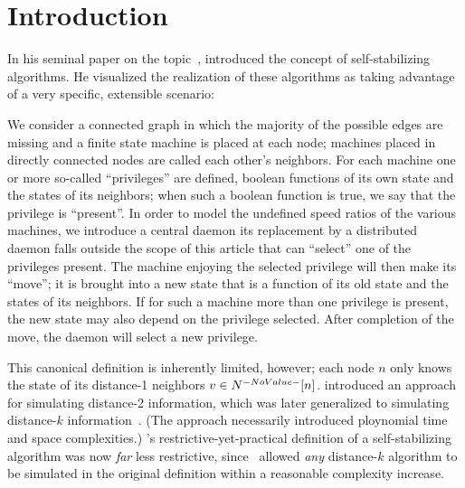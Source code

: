 \section{Introduction}
\label{sec:introduction}
\done{}
In his seminal paper on the topic~\autocite{Dijkstra:1974:SSS:361179.361202},
  \citeauthor{Dijkstra:1974:SSS:361179.361202} introduced the concept of self-stabilizing algorithms.
He visualized the realization of these algorithms as taking advantage of
  a very specific, extensible scenario:
\begin{displayquote}
  We consider a connected graph in which
    the majority of the possible edges are missing and
    a finite state machine is placed at each node;
    machines placed in directly connected nodes are called each other's neighbors.
  For each machine one or more so-called \enquote{privileges} are defined,
    \ie boolean functions of its own state and the states of its neighbors;
    when such a boolean function is true,
    we say that the privilege is \enquote{present}.
  In order to model the undefined speed ratios of the various machines,
    we introduce a central daemon \Dash
    its replacement by a distributed daemon falls outside the scope of this article \Dash
    that can \enquote{select} one of the privileges present.
  The machine enjoying the selected privilege will then make its \enquote{\gls{move}};
    \ie it is brought into a new state that is a function of
    its old state and the states of its neighbors.
  If for such a machine more than one privilege is present,
    the new state may also depend on the privilege selected.
  After completion of the move, the daemon will select a new privilege.
\end{displayquote}
This canonical definition is inherently limited, however;
  each node $n$ only knows the state of its distance-1 neighbors $v \in \ClosedNeighborhood{n}$.
\citeauthor{goddard:ssa--k-distance} introduced an approach for simulating distance-2 information,
  which was later generalized to simulating distance-$k$ information~\autocite{goddard:ssa--k-distance}.
  (The approach necessarily introduced ploynomial time and space complexities.)
\citeauthor{Dijkstra:1974:SSS:361179.361202}'s restrictive-yet-practical definition of a self-stabilizing algorithm
  was now \emph{far} less restrictive,
  since~\autocite{gairing:distance-2,goddard:ssa--k-distance} allowed \emph{any} distance-$k$ algorithm
  to be simulated in the original definition within a reasonable complexity increase.

